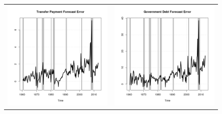\documentclass[11pt]{article}
\begin{document}
\begin{figure}
\begin{center}
\begin{tabular}{cc}
\includegraphics[scale=0.45]{./results/pics0.04/fe_transfers.png} & \includegraphics[scale=0.45]{./results/pics0.04/fe_debt.png}  
\end{tabular}
\end{center}
\end{figure} 
\end{document}
